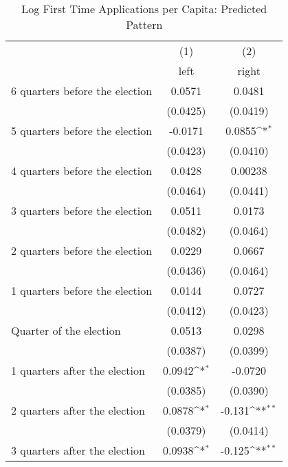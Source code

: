 \begin{table}[htbp]\centering
\def\sym#1{\ifmmode^{#1}\else\(^{#1}\)\fi}
\caption{Log First Time Applications per Capita: Predicted Pattern}
\begin{tabular}{l*{2}{c}}
\hline\hline
                    &\multicolumn{1}{c}{(1)}&\multicolumn{1}{c}{(2)}\\
                    &\multicolumn{1}{c}{left}&\multicolumn{1}{c}{right}\\
\hline
 6 quarters before the election&      0.0571         &      0.0481         \\
                    &    (0.0425)         &    (0.0419)         \\
[1em]
 5 quarters before the election&     -0.0171         &      0.0855\sym{*}  \\
                    &    (0.0423)         &    (0.0410)         \\
[1em]
 4 quarters before the election&      0.0428         &     0.00238         \\
                    &    (0.0464)         &    (0.0441)         \\
[1em]
 3 quarters before the election&      0.0511         &      0.0173         \\
                    &    (0.0482)         &    (0.0464)         \\
[1em]
 2 quarters before the election&      0.0229         &      0.0667         \\
                    &    (0.0436)         &    (0.0464)         \\
[1em]
 1 quarters before the election&      0.0144         &      0.0727         \\
                    &    (0.0412)         &    (0.0423)         \\
[1em]
Quarter of the election&      0.0513         &      0.0298         \\
                    &    (0.0387)         &    (0.0399)         \\
[1em]
 1 quarters after the election&      0.0942\sym{*}  &     -0.0720         \\
                    &    (0.0385)         &    (0.0390)         \\
[1em]
 2 quarters after the election&      0.0878\sym{*}  &      -0.131\sym{**} \\
                    &    (0.0379)         &    (0.0414)         \\
[1em]
 3 quarters after the election&      0.0938\sym{*}  &      -0.125\sym{**} \\

\end{tabular}
\end{table}
